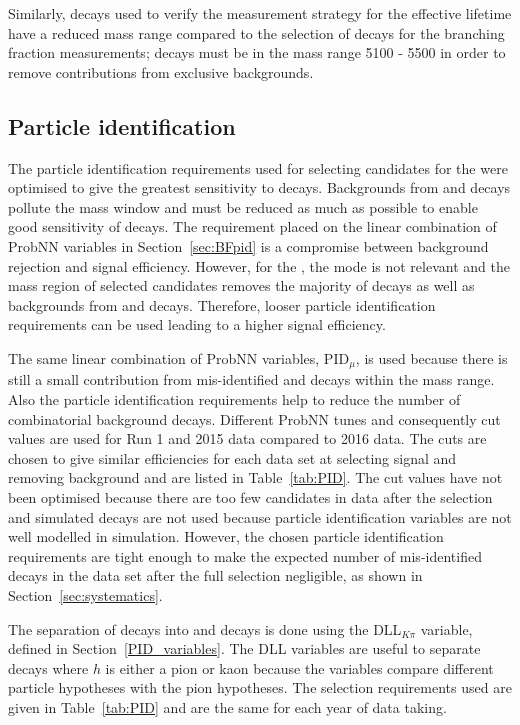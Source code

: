 Similarly, \bhh decays used to verify the measurement strategy for the \bsmumu effective lifetime have a reduced mass range compared to the selection of \bhh decays for the branching fraction measurements; \bhh decays must be in the mass range 5100 - 5500 \mevcc in order to remove contributions from exclusive backgrounds.

\subsection{Particle identification}
\label{sec:ELpid}
The particle identification requirements used for selecting candidates for the \BFm were optimised to give the greatest sensitivity to \bdmumu decays. Backgrounds from \bhh and \lambdab decays pollute the \bd mass window and must be reduced as much as possible to enable good sensitivity of \bdmumu decays. The requirement placed on the linear combination of ProbNN variables in Section~\ref{sec:BFpid} is a compromise between background rejection and signal efficiency. However, for the \elm, the \bd mode is not relevant and the mass region of selected candidates removes the majority of \bdmumu decays as well as backgrounds from \bhh and \lambdab decays. Therefore, looser particle identification requirements can be used leading to a higher signal efficiency.%

The same linear combination of ProbNN variables, PID$_{\mu}$, is used because there is still a small contribution from mis-identified \bhh and \lambdab decays within the mass range. Also the particle identification requirements help to reduce the number of combinatorial background decays. Different ProbNN tunes and consequently cut values are used for Run 1 and 2015 data compared to 2016 data. The cuts are chosen to give similar efficiencies for each data set at selecting signal and removing background and are listed in Table~\ref{tab:PID}. The cut values have not been optimised because there are too few candidates in data after the selection and simulated decays are not used because particle identification variables are not well modelled in simulation. However, the chosen particle identification requirements are tight enough to make the expected number of mis-identified decays in the data set after the full selection negligible, as shown in Section~\ref{sec:systematics}. 

The separation of \bhh decays into \bskk and \bskpi decays is done using the DLL$_{K\pi}$ variable, defined in Section~\ref{PID_variables}. The DLL variables are useful to separate \bhh decays where $h$ is either a pion or kaon because the variables compare different particle hypotheses with the pion hypotheses. The selection requirements used are given in Table~\ref{tab:PID} and are the same for each year of data taking.


